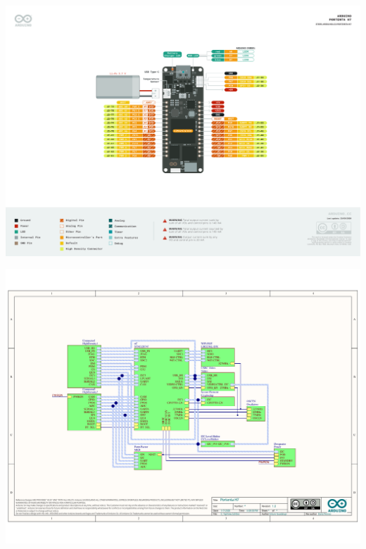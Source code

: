 \setcounter{mycounter}{1}

{
  \includegraphics[width=1\textwidth,page=\themycounter]{../../MLbib/Arduino/PortentaH7/Pinout-PortentaH7_latest.pdf}
  \newpage
}

\setcounter{mycounter}{1}

{
	\includegraphics[width=1\textwidth,page=\themycounter]{../../MLbib/Arduino/PortentaH7/Arduino-PortentaH7-schematic-V10.pdf}
	\newpage
}

\setcounter{mycounter}{1}

